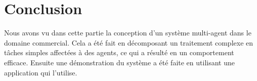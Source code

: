 \section{Conclusion}
Nous avons vu dans cette partie la conception d’un système multi-agent dans le domaine commercial. Cela a été fait en décomposant un traitement complexe en tâches simples affectées à des agents, ce qui a résulté en un comportement efficace. Ensuite une démonstration du système a été faite en utilisant une application qui l’utilise.